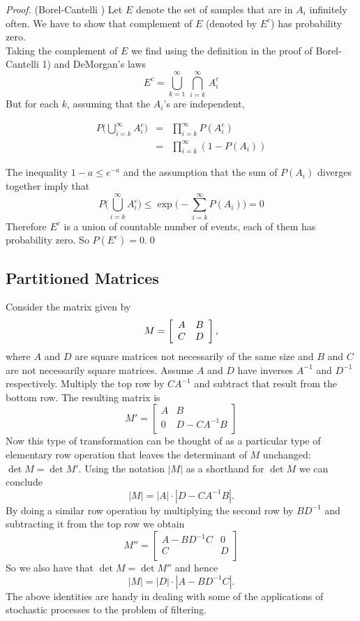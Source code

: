 \begin{proof}{(Borel-Cantelli {})}
Let $E$ denote the set of samples that are in $A_i$ infinitely often. We have to show that complement of $E$ (denoted by $E^c$) has probability zero.\\

Taking the complement of $E$ we find using the definition in the proof of Borel-Cantelli 1) and DeMorgan's laws
$$E^c = \bigcup\limits_{k=1}^\infty \, \bigcap\limits_{i=k}^\infty \, A_i^c $$ But for each $k$, assuming that the $A_i$'s are independent, 

\begin{eqnarray*}
P\big(\bigcup\limits_{i=k}^\infty A_i^c \big) &=& \prod_{i=k}^\infty P(A_i^c) \\
&=& \prod_{i=k}^\infty (1 - P(A_i))
\end{eqnarray*}

The inequality $1 - a \le e^{-a}$ and the assumption that the sum of $P(A_i)$ diverges together imply that
$$P\big( \bigcup\limits_{i=k}^\infty A_i^c \big) \le \exp\Big( -\sum_{i=k}^\infty P(A_i) \Big)  = 0$$
Therefore $E^c$ is a union of countable number of events, each of them has probability zero. So $P(E^c) = 0$.\qed
\end{proof}
 
\subsection{Partitioned Matrices}
\label{sec:partitioned}
Consider the matrix given by 
$$M = \left[
\begin{array}{c c}
 A & B \\
C & D \\
\end{array}\right],$$
where $A$ and $D$ are square matrices not necessarily of the same size and $B$ and $C$ are not necessarily square matrices. Assume $A$ and $D$ have inverses $A^{-1}$ and $D^{-1}$ respectively. Multiply the top row by $CA^{-1}$ and subtract that result from the bottom row. The resulting matrix is 
$$M' = \left[ 
\begin{array}{cc}
A & B \\
0 & D - CA^{-1}B \\
\end{array}
\right]$$ Now this type of transformation can be thought of as a particular type of elementary row operation that leaves the determinant of $M$ unchanged: $\det M = \det M'$. Using the notation $|M|$ as a shorthand for $\det M$ we can conclude $$|M| = |A| \cdot | D - CA^{-1}B|.$$ By doing a similar row operation by multiplying the second row by $BD^{-1}$ and subtracting it from the top row we obtain
$$M'' = \begin{bmatrix} 
A - BD^{-1}C & 0 \\
C & D\\
\end{bmatrix}$$ So we also have that $\det M = \det M''$ and hence $$|M| = |D| \cdot |A - BD^{-1}C|.$$ The above identities are handy in dealing with some of the applications of stochastic processes to the problem of filtering. \\

